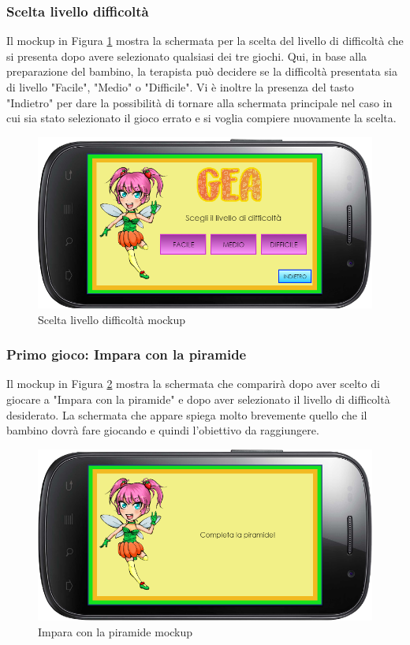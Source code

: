 \subsubsection{Scelta livello difficoltà}
Il mockup in Figura \ref{fig:Scelta livello difficoltà} mostra la schermata per la scelta del livello di difficoltà che si presenta dopo avere selezionato qualsiasi dei tre giochi. Qui, in base alla preparazione del bambino, la terapista può decidere se la difficoltà presentata sia di livello "Facile", "Medio" o "Difficile". Vi è inoltre la presenza del tasto "Indietro" per dare la possibilità di tornare alla schermata principale nel caso in cui sia stato selezionato il gioco errato e si voglia compiere nuovamente la scelta. 

\vspace{70pt}

\begin{figure}[htbp]
\centering
\includegraphics[width=\textwidth]{Images/Mockup/livelli}
\caption{Scelta livello difficoltà mockup}
\label{fig:Scelta livello difficoltà}
\end{figure}
\clearpage
\subsubsection{Primo gioco: Impara con la piramide}
Il mockup in Figura \ref{fig:Impara con la piramide} mostra la schermata che comparirà dopo aver scelto di giocare a "Impara con la piramide" e dopo aver selezionato il livello di difficoltà desiderato. La schermata che appare spiega molto brevemente quello che il bambino dovrà fare giocando e quindi l'obiettivo da raggiungere.
\vspace{70pt}
\begin{figure}[htbp]
\centering
\includegraphics[width=\textwidth]{Images/Mockup/gioco1}
\caption{Impara con la piramide mockup}
\label{fig:Impara con la piramide}
\end{figure}
\clearpage

